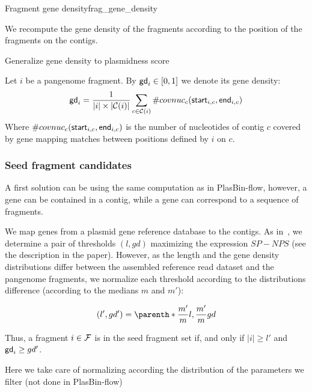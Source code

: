 \begin{definition}{Fragment gene density}{frag_gene_density}
  \begin{newfeatbox}
    We recompute the gene density of the fragments according to the position of the fragments on the contigs.
  \end{newfeatbox}

  \begin{refactorbox}
    Generalize gene density to plasmidness score
  \end{refactorbox}
  Let \(i\) be a pangenome fragment.
  By \(\mathsf{gd}_{i} \in [0, 1]\) we denote its gene density:
  \[
    \mathsf{gd}_{i} = \frac{1}{ |i| \times |\mathcal{C}{}(i)| } \sum_{\substack{
        c \in \mathcal{C}{}(i) \\
    }} \#covnuc_{c}(\mathsf{start}_{i, c}, \mathsf{end}_{i, c})
  \]
  Where \(\#covnuc_{c}(\mathsf{start}_{i, c}, \mathsf{end}_{i, c})\) is the number of nucleotides of contig \(c\) covered by gene mapping matches between positions defined by \(i\) on \(c\).
\end{definition}

\subsubsection{Seed fragment candidates}

\begin{notebox}
  A first solution can be using the same computation as in PlasBin-flow, however, a gene can be contained in a contig, while a gene can correspond to a sequence of fragments.
\end{notebox}

We map genes from a plasmid gene reference database to the contigs.
As in~\cite{manePlasBinflowFlowbasedMILP2023}, we determine a pair of thresholds \((l, gd)\) maximizing the expression \(SP - NPS\) (see the description in the paper).
However, as the length and the gene density distributions differ between the assembled reference read dataset and the pangenome fragments, we normalize each threshold according to the distributions difference (according to the medians \(m\) and \(m'\)):

\[
  (l', gd') = \parenth*{\frac{m'}{m} l, \frac{m'}{m} gd}
\]

Thus, a fragment \(i \in \mathcal{F}{}\) is in the seed fragment set \SeedFrags{} if, and only if \(|i| \geq l'\) and \(\mathsf{gd}_{i} \geq gd'\).

\begin{newfeatbox}
  Here we take care of normalizing according the distribution of the parameters we filter (not done in PlasBin-flow)
\end{newfeatbox}

